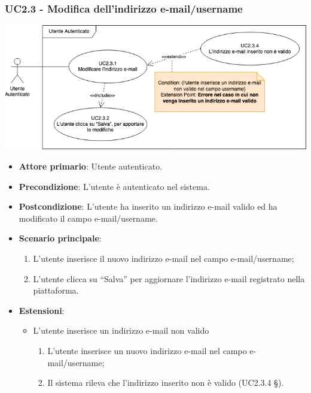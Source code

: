 \subsubsection{UC2.3 - Modifica dell'indirizzo e-mail/username}
\begin{center}
\includegraphics[scale=0.5]{UC_images/UC2_3.png}
\end{center}
\begin{itemize}
\item \textbf{Attore primario}: Utente autenticato.
\item \textbf{Precondizione}: L’utente è autenticato nel sistema.
\item \textbf{Postcondizione}: L’utente ha inserito un indirizzo e-mail valido ed ha modificato il campo e-mail/username.

\item \textbf{Scenario principale}:
\begin{enumerate}
\item L’utente inserisce il nuovo indirizzo e-mail nel campo e-mail/username;
\item L’utente clicca su “Salva” per aggiornare l'indirizzo e-mail registrato nella piattaforma.
\end{enumerate}

\item \textbf{Estensioni}:
\begin{itemize}
\item L’utente inserisce un indirizzo e-mail non valido
\begin{enumerate}
	\item L’utente inserisce un nuovo indirizzo e-mail nel campo e-mail/username;
	\item Il sistema rileva che l’indirizzo inserito non è valido (UC2.3.4 §).
\end{enumerate}
\end{itemize}
\end{itemize}

